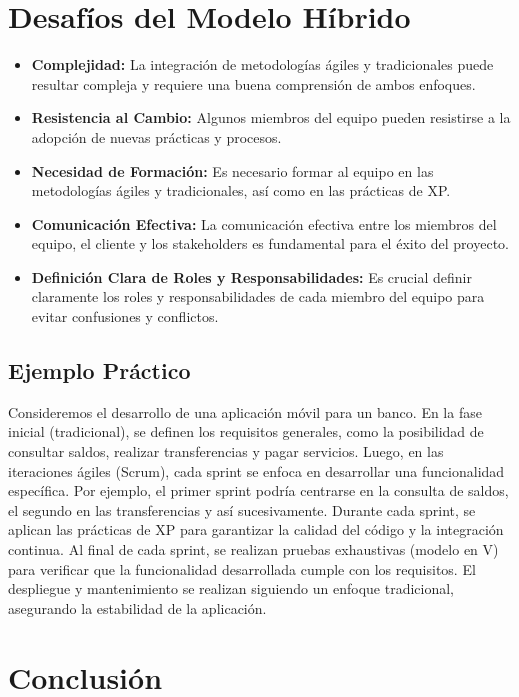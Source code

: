 \documentclass[12pt, spanish]{article}
\begin{document}
\section*{Desafíos del Modelo Híbrido}

\begin{itemize}
    \item \textbf{Complejidad:} La integración de metodologías ágiles y tradicionales puede resultar compleja y requiere una buena comprensión de ambos enfoques.
    \item \textbf{Resistencia al Cambio:} Algunos miembros del equipo pueden resistirse a la adopción de nuevas prácticas y procesos.
    \item \textbf{Necesidad de Formación:} Es necesario formar al equipo en las metodologías ágiles y tradicionales, así como en las prácticas de XP.
    \item \textbf{Comunicación Efectiva:} La comunicación efectiva entre los miembros del equipo, el cliente y los stakeholders es fundamental para el éxito del proyecto.
    \item \textbf{Definición Clara de Roles y Responsabilidades:} Es crucial definir claramente los roles y responsabilidades de cada miembro del equipo para evitar confusiones y conflictos.
\end{itemize}

\subsection*{Ejemplo Práctico}

Consideremos el desarrollo de una aplicación móvil para un banco. En la fase inicial (tradicional), se definen los requisitos generales, como la posibilidad de consultar saldos, realizar transferencias y pagar servicios. Luego, en las iteraciones ágiles (Scrum), cada sprint se enfoca en desarrollar una funcionalidad específica. Por ejemplo, el primer sprint podría centrarse en la consulta de saldos, el segundo en las transferencias y así sucesivamente. Durante cada sprint, se aplican las prácticas de XP para garantizar la calidad del código y la integración continua. Al final de cada sprint, se realizan pruebas exhaustivas (modelo en V) para verificar que la funcionalidad desarrollada cumple con los requisitos.  El despliegue y mantenimiento se realizan siguiendo un enfoque tradicional, asegurando la estabilidad de la aplicación.

\section*{Conclusión}
\end{document}
